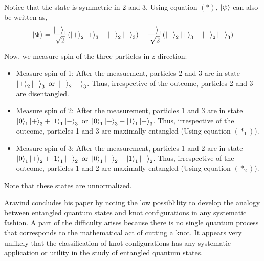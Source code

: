 \documentclass{article}
\begin{document}
Notice that the state is symmetric in 2 and 3. Using equation $(*)$, $\ket{\psi}$ can also be written as,
\[
\ket{\Psi} = \frac{\ket{+}_1}{\sqrt{2}}(\ket{+}_2\ket{+}_3+\ket{-}_2\ket{-}_3)+\frac{\ket{-}_1}{\sqrt{2}}(\ket{+}_2\ket{+}_3-\ket{-}_2\ket{-}_3)
\]



\begin{comment}
    \[
O_1 = \ket{0_1}\bra{0_1}-\ket{1_1}\bra{1_1}
\]
\[
O_1\ket{\psi} = \braket{0_1|\Psi}\ket{0_1} -\braket{1_1|\Psi}\ket{1_1}
\]
\[
= \frac{1}{\sqrt{2}}\ket{+}_2\ket{+}_3\ket{0}_1 -\frac{1}{\sqrt{2}}\ket{-}_2\ket{-}_3\ket{1}_1
\]
\end{comment}


Now, we measure spin of the three particles in z-direction:
\begin{itemize}

    \item Measure spin of 1: After the measuement, particles 2 and 3 are in state $\ket{+}_2\ket{+}_3 \text{ or }\ket{-}_2\ket{-}_3$. Thus, irrespective of the outcome, particles 2 and 3 are disentangled. 
    
    \item Measure spin of 2: After the measurement, particles 1 and 3 are in state $\ket{0}_1\ket{+}_3 +\ket{1}_1\ket{-}_3\text{ or } \ket{0}_1\ket{+}_3 -\ket{1}_1\ket{-}_3$. Thus, irrespective of the outcome, particles 1 and 3 are maximally entangled (Using equation $(*_1)$). 
    
    \item Measure spin of 3: After the measurement, particles 1 and 2 are in state $\ket{0}_1\ket{+}_2 +\ket{1}_1\ket{-}_2\text{ or }\ket{0}_1\ket{+}_2 -\ket{1}_1\ket{-}_2$. Thus, irrespective of the outcome, particles 1 and 2 are maximally entangled (Using equation $(*_2)$).
    
\end{itemize}

Note that these states are unnormalized.


Aravind concludes his paper by noting the low possiblility to develop the analogy between entangled quantum states and knot configurations in any systematic fashion. A part of the difficulty arises because there is no single quantum process that corresponds to the mathematical act of cutting a knot. It appears very unlikely that the classification of knot configurations has any systematic application or utility in the study of entangled quantum states.
\end{document}

